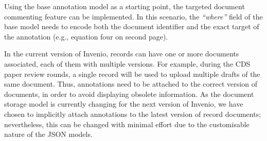 
Using the base annotation model as a starting point, the targeted document
commenting feature can be implemented. In this scenario, the \textit{``where''}
field of the base model needs to encode both the document identifier and the
exact target of the annotation (e.g., equation four on second page).

In the current version of Invenio, records can have one or more documents
associated, each of them with multiple versions. For example, during the CDS
paper review rounds, a single record will be used to upload multiple drafts of
the same document. Thus, annotations need to be attached to the correct version
of documents, in order to avoid displaying obsolete information. As the document
storage model is currently changing for the next version of Invenio, we have
chosen to implicitly attach annotations to the latest version of record
documents; nevertheless, this can be changed with minimal effort due to the
customisable nature of the JSON models.

